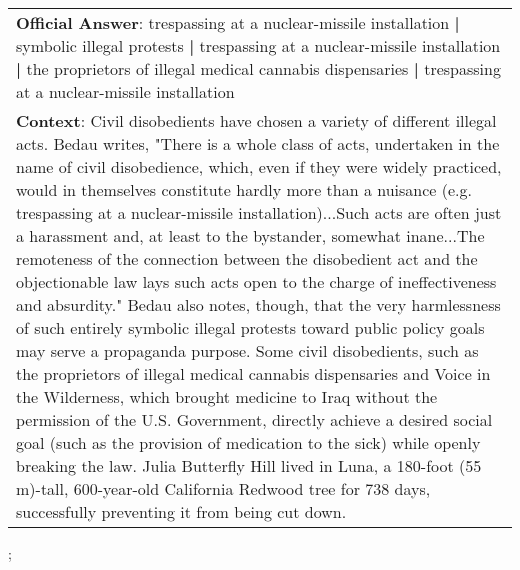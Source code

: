 \begin{figure*}[ht]
{\begin{tabular}{p{}}
            \textbf{Official Answer}: trespassing at a nuclear-missile installation \textbf{|} symbolic illegal protests \textbf{|} trespassing at a nuclear-missile installation \textbf{|} the proprietors of illegal medical cannabis dispensaries \textbf{|} trespassing at a nuclear-missile installation                                                                                                                                                                                                                                                                                                                                                                                                                                                                                                                                                                                                                                                                                                                                                                                                                                                                                                                                                        \\
            \textbf{Context}: Civil disobedients have chosen a variety of different illegal acts. Bedau writes, "There is a whole class of acts, undertaken in the name of civil disobedience, which, even if they were widely practiced, would in themselves constitute hardly more than a nuisance (e.g. trespassing at a nuclear-missile installation)...Such acts are often just a harassment and, at least to the bystander, somewhat inane...The remoteness of the connection between the disobedient act and the objectionable law lays such acts open to the charge of ineffectiveness and absurdity." Bedau also notes, though, that the very harmlessness of such entirely symbolic illegal protests toward public policy goals may serve a propaganda purpose. Some civil disobedients, such as the proprietors of illegal medical cannabis dispensaries and Voice in the Wilderness, which brought medicine to Iraq without the permission of the U.S. Government, directly achieve a desired social goal (such as the provision of medication to the sick) while openly breaking the law. Julia Butterfly Hill lived in Luna, a 180-foot (55 m)-tall, 600-year-old California Redwood tree for 738 days, successfully preventing it from being cut down. \\
        \end{tabular}
    };
    \label{fig:ex-5728e5224b864d1900165033}
\end{figure*}

